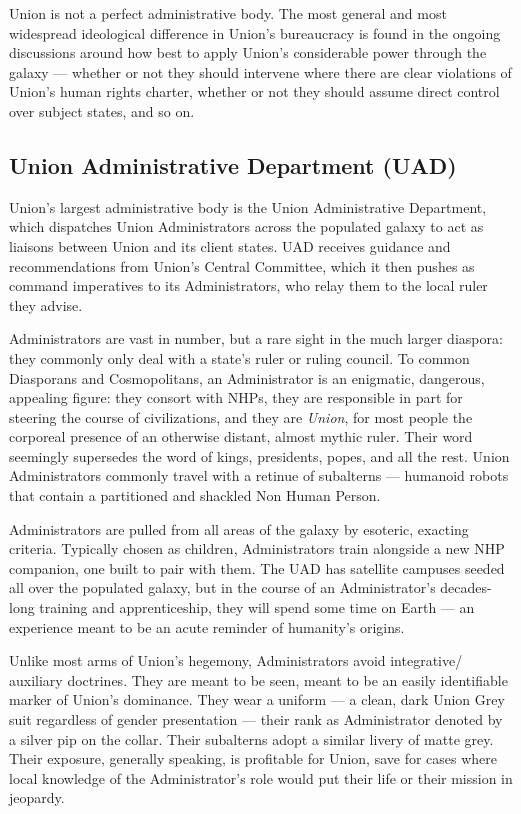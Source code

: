 Union is not a perfect administrative body. The most general and most widespread ideological
difference in Union’s bureaucracy is found in the ongoing discussions around how best to apply
Union’s considerable power through the galaxy — whether or not they should intervene where
there are clear violations of Union’s human rights charter, whether or not they should assume
direct control over subject states, and so on.

\subsection{Union Administrative Department (UAD)}

Union’s largest administrative body is the Union Administrative Department, which dispatches
Union Administrators across the populated galaxy to act as liaisons between Union and its client
states. UAD receives guidance and recommendations from Union’s Central Committee, which it
then pushes as command imperatives to its Administrators, who relay them to the local ruler they
advise.

Administrators are vast in number, but a rare sight in the much larger diaspora: they commonly
only deal with a state’s ruler or ruling council. To common Diasporans and Cosmopolitans, an
Administrator is an enigmatic, dangerous, appealing figure: they consort with NHPs, they are
responsible in part for steering the course of civilizations, and they are \textit{Union}, for most people
the corporeal presence of an otherwise distant, almost mythic ruler. Their word seemingly
supersedes the word of kings, presidents, popes, and all the rest. Union Administrators
commonly travel with a retinue of subalterns — humanoid robots that contain a partitioned and
shackled Non Human Person.

Administrators are pulled from all areas of the galaxy by esoteric, exacting criteria. Typically
chosen as children, Administrators train alongside a new NHP companion, one built to pair with
them. The UAD has satellite campuses seeded all over the populated galaxy, but in the course of
an Administrator’s decades-long training and apprenticeship, they will spend some time on Earth
— an experience meant to be an acute reminder of humanity’s origins.

Unlike most arms of Union’s hegemony, Administrators avoid integrative/ auxiliary doctrines.
They are meant to be seen, meant to be an easily identifiable marker of Union’s dominance. They
wear a uniform — a clean, dark Union Grey suit regardless of gender presentation — their rank
as Administrator denoted by a silver pip on the collar. Their subalterns adopt a similar livery of
matte grey. Their exposure, generally speaking, is profitable for Union, save for cases where local
knowledge of the Administrator’s role would put their life or their mission in jeopardy.

